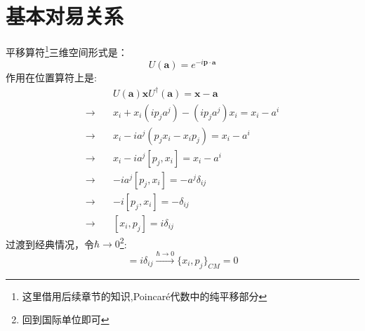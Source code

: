 \section{基本对易关系}
    平移算符\footnote{这里借用后续章节的知识,Poincar\'e代数中的纯平移部分}三维空间形式是：
\begin{equation}
    U(\boldsymbol{a})=e^{-i\boldsymbol{p}\cdot\boldsymbol{a}}
\end{equation}
    作用在位置算符上是:
\begin{equation}
    \begin{aligned}
        &U(\boldsymbol{a})\boldsymbol{x}U^\dagger(\boldsymbol{a})=\boldsymbol{x}-\boldsymbol{a}\\
        \to\quad& x_i + x_i\left(ip_j a^j\right) - \left(ip_j a^j\right)x_i = x_i - a^i \\
        \to\quad& x_i - i a^j (p_j x_i - x_i p_j) = x_i - a^i \\
        \to\quad& x_i - i a^j [p_j, x_i] = x_i - a^i \\
        \to\quad& -i a^j [p_j, x_i] = -a^j\delta_{ij} \\
        \to\quad& -i [p_j, x_i] = -\delta_{ij} \\
        \to\quad& [ x_i,p_j] = i \delta_{ij}
    \end{aligned}
\end{equation}
过渡到经典情况，令$\hbar\to0$\footnote{回到国际单位即可}:\begin{equation}
    [ x_i,p_j] = i \delta_{ij}\overset{\hbar\to0}{\longrightarrow}\{ x_i,p_j\}_{CM}=0
\end{equation}
